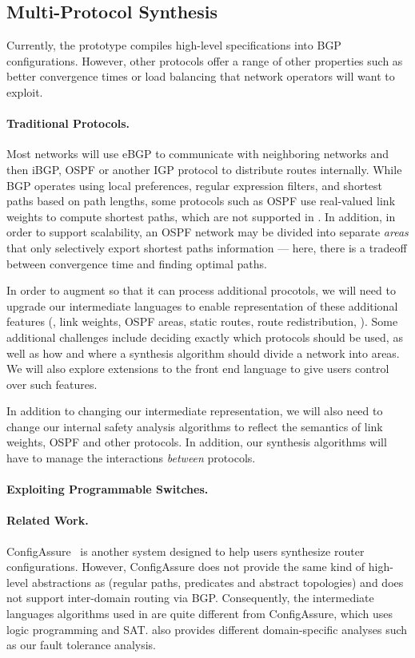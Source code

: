 \subsection{Multi-Protocol Synthesis}

Currently, the \Propane prototype compiles high-level specifications into BGP
configurations.  However, other protocols offer a range of other properties
such as better convergence times or load balancing that network operators 
will want to exploit.

\paragraph*{Traditional Protocols.}  Most networks will use
eBGP to communicate with neighboring networks and 
then iBGP, OSPF or another IGP protocol to distribute routes internally.
While BGP operates using local preferences, regular expression filters,
and shortest paths based on path lengths, some protocols such as OSPF
use real-valued link weights to compute shortest paths, which are not
supported in \Propane.  In addition, in order to support scalability, 
an OSPF network may be divided into separate \emph{areas} that only selectively
export shortest paths information --- here, there is a tradeoff between 
convergence time and finding optimal paths.  

In order to
augment \Propane so that it can process additional procotols, we will
need to upgrade our intermediate languages to enable representation 
of these additional features (\eg, link weights, OSPF areas, static routes,
route redistribution, \etc).  
Some additional challenges include deciding exactly which protocols should be used,
as well as how and where
a synthesis algorithm should divide a network into areas.  We will also
explore extensions to the \Propane front end language to give users
control over such features.

In addition to changing our intermediate representation, we will also need to 
change our internal safety analysis algorithms to reflect the semantics of 
link weights, OSPF and other protocols.
In addition, our synthesis algorithms will have to manage the interactions
\emph{between} protocols.

\paragraph*{Exploiting Programmable Switches.}

\paragraph*{Related Work.}
ConfigAssure~\cite{narain:lisa05,narain+:configassure}  is another
system designed to help users synthesize
router configurations. However, ConfigAssure does not 
provide the same kind of high-level abstractions as \Propane
(regular paths, predicates and abstract topologies) and does not
support inter-domain routing via BGP.  Consequently,
the intermediate languages algorithms used in \Propane are quite
different from ConfigAssure, which uses logic programming and SAT.
\Propane also provides different domain-specific analyses such as
our fault tolerance analysis.

